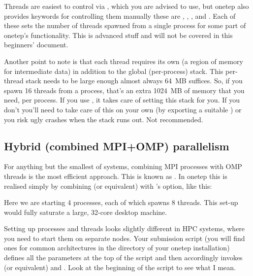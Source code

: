 \documentclass[letterpaper,10pt,english]{sphinxmanual}
\begin{document}
Threads are easiest to control via , which you are
advised to use, but onetep also provides keywords for controlling them
manually \textendash{} these are , ,
,  and
. Each of these sets the number of threads spawned
from a single process for some part of onetep’s functionality. This is
advanced stuff and will not be covered in this beginners’ document.

Another point to note is that each thread requires its own  (a
region of memory for intermediate data) in addition to the global
(per-process) stack. This per-thread stack needs to be large enough \textendash{}
almost always 64 MB suffices. So, if you spawn 16 threads from a
process, that’s an extra 1024 MB of memory that you need, per process.
If you use , it takes care of setting this stack for
you. If you don’t \textendash{} you’ll need to take care of this on your own (by
exporting a suitable ) or you risk ugly crashes when
the stack runs out. Not recommended.


\subsection{Hybrid (combined MPI+OMP) parallelism}
\label{\detokenize{starting_with_onetep:hybrid-combined-mpi-omp-parallelism}}
For anything but the smallest of systems, combining MPI processes with
OMP threads is the most efficient approach. This is known as . In onetep this is realised simply by combining 
(or equivalent) with ’s  option, like this:


Here we are starting 4 processes, each of which spawns 8 threads. This
set-up would fully saturate a large, 32-core desktop machine.

Setting up processes and threads looks slightly different in HPC
systems, where you need to start them on separate nodes. Your submission
script (you will find ones for common architectures in the
 directory of your onetep installation) defines all the
parameters at the top of the script and then accordingly invokes
 (or equivalent) and . Look at the
beginning of the script to see what I mean.
\end{document}
